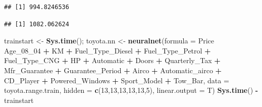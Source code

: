 \documentclass[]{article}
\newenvironment{Shaded}{\begin{snugshade}}{\end{snugshade}}
\newcommand{\KeywordTok}[1]{\textcolor[rgb]{0.13,0.29,0.53}{\textbf{#1}}}
\newcommand{\DataTypeTok}[1]{\textcolor[rgb]{0.13,0.29,0.53}{#1}}
\newcommand{\DecValTok}[1]{\textcolor[rgb]{0.00,0.00,0.81}{#1}}
\newcommand{\StringTok}[1]{\textcolor[rgb]{0.31,0.60,0.02}{#1}}
\newcommand{\CommentTok}[1]{\textcolor[rgb]{0.56,0.35,0.01}{\textit{#1}}}
\newcommand{\OperatorTok}[1]{\textcolor[rgb]{0.81,0.36,0.00}{\textbf{#1}}}
\newcommand{\NormalTok}[1]{#1}
\begin{document}
\begin{verbatim}
## [1] 994.8246536
\end{verbatim}

\begin{Shaded}
\end{Shaded}

\begin{verbatim}
## [1] 1082.062624
\end{verbatim}

\begin{Shaded}
\begin{Highlighting}[]
\NormalTok{trainstart <-}\StringTok{ }\KeywordTok{Sys.time}\NormalTok{();}
\NormalTok{toyota.nn <-}\StringTok{ }\KeywordTok{neuralnet}\NormalTok{(}\DataTypeTok{formula =}\NormalTok{ Price }\OperatorTok{~}\StringTok{ }\NormalTok{Age_08_}\DecValTok{04} \OperatorTok{+}\StringTok{ }\NormalTok{KM }\OperatorTok{+}\StringTok{ }\NormalTok{Fuel_Type_Diesel }\OperatorTok{+}\StringTok{ }\NormalTok{Fuel_Type_Petrol }\OperatorTok{+}\StringTok{ }\NormalTok{Fuel_Type_CNG }\OperatorTok{+}\StringTok{ }\NormalTok{HP }\OperatorTok{+}\StringTok{ }\NormalTok{Automatic }\OperatorTok{+}\StringTok{ }\NormalTok{Doors }\OperatorTok{+}\StringTok{ }\NormalTok{Quarterly_Tax }\OperatorTok{+}\StringTok{ }\NormalTok{Mfr_Guarantee }\OperatorTok{+}\StringTok{ }\NormalTok{Guarantee_Period }\OperatorTok{+}\StringTok{ }\NormalTok{Airco }\OperatorTok{+}\StringTok{ }\NormalTok{Automatic_airco }\OperatorTok{+}\StringTok{ }\NormalTok{CD_Player }\OperatorTok{+}\StringTok{ }\NormalTok{Powered_Windows }\OperatorTok{+}\StringTok{ }\NormalTok{Sport_Model }\OperatorTok{+}\StringTok{ }\NormalTok{Tow_Bar, }\DataTypeTok{data =}\NormalTok{ toyota.range.train, }\DataTypeTok{hidden =} \KeywordTok{c}\NormalTok{(}\DecValTok{13}\NormalTok{,}\DecValTok{13}\NormalTok{,}\DecValTok{13}\NormalTok{,}\DecValTok{13}\NormalTok{,}\DecValTok{13}\NormalTok{,}\DecValTok{5}\NormalTok{), }\DataTypeTok{linear.output =}\NormalTok{ T)}
\KeywordTok{Sys.time}\NormalTok{() }\OperatorTok{-}\StringTok{ }\NormalTok{trainstart}
\end{Highlighting}
\end{Shaded}
\end{document}
